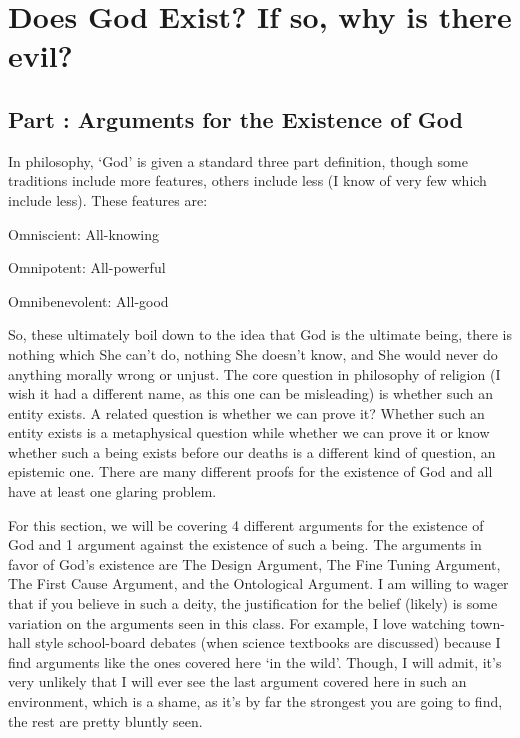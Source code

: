 \part{Does God Exist? If so, why is there evil?}
\label{ch.modfive}
\chapter{Part \thechapcount: Arguments for the Existence of God}\setcounter{seccount}{1}
In philosophy, ‘God’ is given a standard three part definition, though some traditions include more features, others include less (I know of very few which include less). These features are:
\begin{earg}
    \item[]Omniscient: All-knowing
    \item[]Omnipotent: All-powerful
    \item[]Omnibenevolent: All-good
\end{earg}
So, these ultimately boil down to the idea that God is the ultimate being, there is nothing which She can't do, nothing She doesn't know, and She would never do anything morally wrong or unjust. The core question in philosophy of religion (I wish it had a different name, as this one can be misleading) is whether such an entity exists. A related question is whether we can prove it? Whether such an entity exists is a metaphysical question while whether we can prove it or know whether such a being exists before our deaths is a different kind of question, an epistemic one. There are many different proofs for the existence of God and all have at least one glaring problem.

For this section, we will be covering 4 different arguments for the existence of God and 1 argument against the existence of such a being. The arguments in favor of God's existence are The Design Argument, The Fine Tuning Argument, The First Cause Argument, and the Ontological Argument. I am willing to wager that if you believe in such a deity, the justification for the belief (likely) is some variation on the arguments seen in this class. For example, I love watching town-hall style school-board debates (when science textbooks are discussed) because I find arguments like the ones covered here `in the wild'. Though, I will admit, it's very unlikely that I will ever see the last argument covered here in such an environment, which is a shame, as it's by far the strongest you are going to find, the rest are pretty bluntly seen.  


